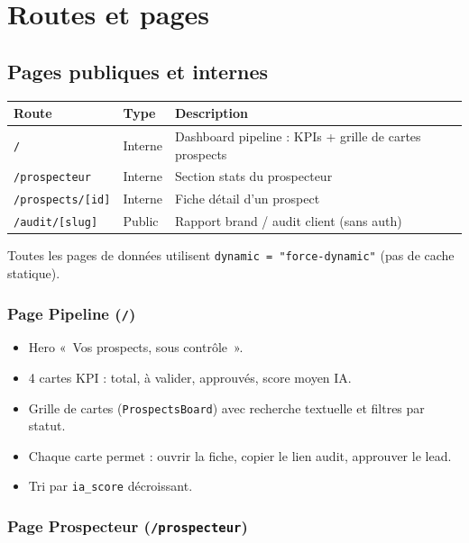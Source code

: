 \documentclass[11pt,a4paper]{report}
\begin{document}
\chapter{Routes et pages}

\section{Pages publiques et internes}

\begin{table}[h]
\centering
\begin{tabular}{@{}llp{7cm}@{}}
\toprule
\textbf{Route} & \textbf{Type} & \textbf{Description} \\
\midrule
\texttt{/} & Interne & Dashboard pipeline : KPIs + grille de cartes prospects \\
\texttt{/prospecteur} & Interne & Section stats du prospecteur \\
\texttt{/prospects/[id]} & Interne & Fiche détail d'un prospect \\
\texttt{/audit/[slug]} & Public & Rapport brand / audit client (sans auth) \\
\bottomrule
\end{tabular}
\end{table}

Toutes les pages de données utilisent \texttt{dynamic = "force-dynamic"} (pas de cache statique).

\subsection{Page Pipeline (\texttt{/})}

\begin{itemize}[leftmargin=*]
  \item Hero «~Vos prospects, sous contrôle~».
  \item 4 cartes KPI : total, à valider, approuvés, score moyen IA.
  \item Grille de cartes (\texttt{ProspectsBoard}) avec recherche textuelle et filtres par statut.
  \item Chaque carte permet : ouvrir la fiche, copier le lien audit, approuver le lead.
  \item Tri par \texttt{ia\_score} décroissant.
\end{itemize}

\subsection{Page Prospecteur (\texttt{/prospecteur})}
\end{document}
